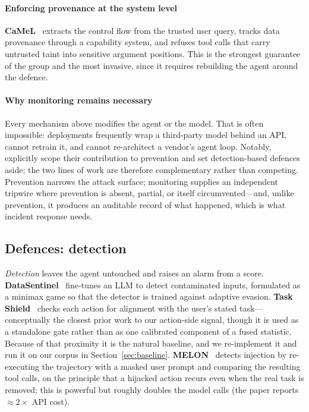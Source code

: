 \documentclass[preprint,12pt,authoryear]{elsarticle}
\theoremstyle{definition}
\begin{document}
\paragraph{Enforcing provenance at the system level}
\textbf{CaMeL}~\citep{debenedetti2025camel} extracts the control flow from the
trusted user query, tracks data provenance through a capability system, and
refuses tool calls that carry untrusted taint into sensitive argument positions.
This is the strongest guarantee of the group and the most invasive, since it
requires rebuilding the agent around the defence.

\paragraph{Why monitoring remains necessary}
Every mechanism above modifies the agent or the model. That is often impossible:
deployments frequently wrap a third-party model behind an API, cannot retrain it,
and cannot re-architect a vendor's agent loop. Notably, \citet{chen2025secalign}
explicitly scope their contribution to prevention and set detection-based defences
aside; the two lines of work are therefore complementary rather than competing.
Prevention narrows the attack surface; monitoring supplies an independent tripwire
where prevention is absent, partial, or itself circumvented---and, unlike
prevention, it produces an auditable record of what happened, which is what
incident response needs.

\subsection{Defences: detection}

\emph{Detection} leaves the agent untouched and raises an alarm from a score.
\textbf{DataSentinel}~\citep{liu2025datasentinel} fine-tunes an LLM to detect
contaminated inputs, formulated as a minimax game so that the detector is trained
against adaptive evasion. \textbf{Task Shield}~\citep{jia2024taskshield} checks
each action for alignment with the user's stated task---conceptually the closest
prior work to our action-side signal, though it is used as a standalone gate
rather than as one calibrated component of a fused statistic. Because of that
proximity it is the natural baseline, and we re-implement it and run it on our
corpus in Section~\ref{sec:baseline}.
\textbf{MELON}~\citep{zhu2025melon} detects injection by re-executing the
trajectory with a masked user prompt and comparing the resulting tool calls, on
the principle that a hijacked action recurs even when the real task is removed;
this is powerful but roughly doubles the model calls (the paper reports
$\approx 2\times$ API cost).
\end{document}
